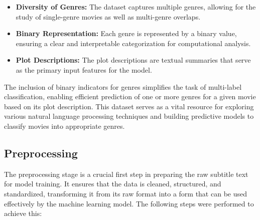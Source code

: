 \documentclass[conference]{IEEEtran}
\begin{document}
\begin{itemize}
    \item \textbf{Diversity of Genres:} The dataset captures multiple genres, allowing for the study of single-genre movies as well as multi-genre overlaps.
    \item \textbf{Binary Representation:} Each genre is represented by a binary value, ensuring a clear and interpretable categorization for computational analysis.
    \item \textbf{Plot Descriptions:} The plot descriptions are textual summaries that serve as the primary input features for the model.
\end{itemize}

The inclusion of binary indicators for genres simplifies the task of multi-label classification, enabling efficient prediction of one or more genres for a given movie based on its plot description. This dataset serves as a vital resource for exploring various natural language processing techniques and building predictive models to classify movies into appropriate genres.

\subsection{Preprocessing}
The preprocessing stage is a crucial first step in preparing the raw subtitle text for model training. It ensures that the data is cleaned, structured, and standardized, transforming it from its raw format into a form that can be used effectively by the machine learning model. The following steps were performed to achieve this:
\end{document}
